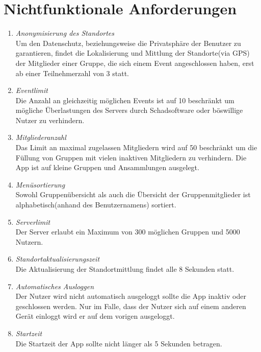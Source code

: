 \documentclass[parskip=full]{scrartcl}
\def\threedigits#1{%
  \ifnum#1<100 0\fi
  \ifnum#1<10 0\fi
  \number#1}
\begin{document}
\section{Nichtfunktionale Anforderungen}
\begin{enumerate}[label={\textbf{/NF\protect\threedigits{\theenumi}0/}}, leftmargin=*]
		\item \textit{Anonymisierung des Standortes} \\
		Um den Datenschutz, beziehungsweise die Privatsphäre der Benutzer zu garantieren, findet die Lokalisierung und Mittlung der Standorte(via GPS) der Mitglieder einer Gruppe, die sich einem Event angeschlossen haben, erst ab einer Teilnehmerzahl von 3 statt. 
		
		\item \textit{Eventlimit} \\
		Die Anzahl an gleichzeitig möglichen Events ist auf 10 beschränkt um mögliche Überlastungen des Servers durch Schadsoftware oder böswillige Nutzer zu verhindern.
		
		\item \textit{Mitgliederanzahl} \\
		Das Limit an maximal zugelassen Mitgliedern wird auf 50 beschränkt um die Füllung von Gruppen mit vielen inaktiven Mitgliedern zu verhindern. Die App ist auf kleine Gruppen und Ansammlungen ausgelegt.
		
		\item \textit{Menüsortierung} \\
		Sowohl Gruppenübersicht als auch die Übersicht der Gruppenmitglieder ist alphabetisch(anhand des Benutzernamens) sortiert. 
		
		\item \textit{Serverlimit} \\
		Der Server erlaubt ein Maximum von 300 möglichen Gruppen und 5000 Nutzern.
		
		\item \textit{Standortaktualisierungszeit} \\
		Die Aktualisierung der Standortmittlung findet alle 8 Sekunden statt.
		
		\item \textit{Automatisches Ausloggen} \\
		Der Nutzer wird nicht automatisch ausgeloggt sollte die App inaktiv oder geschlossen werden. Nur im Falle, dass der Nutzer sich auf einem anderen Gerät einloggt wird er auf dem vorigen ausgeloggt.
		
		\item \textit{Startzeit} \\
		Die Startzeit der App sollte nicht länger als 5 Sekunden betragen.
		
\end{enumerate}
\end{document}
